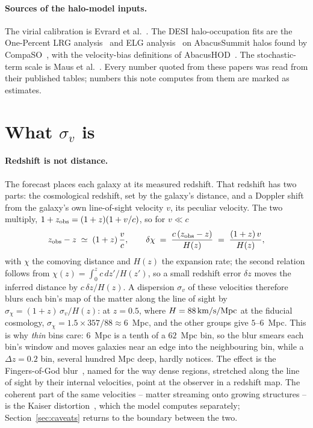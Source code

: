 \documentclass[11pt]{article}
\newcommand{\sv}{\sigma_v}
\newcommand{\kms}{\,{\rm km/s}}
\begin{document}
\paragraph{Sources of the halo-model inputs.}
The virial calibration is Evrard et al.~\cite{Evrard2008}.  The DESI
halo-occupation fits are the One-Percent LRG analysis~\cite{Yuan2023}
and ELG analysis~\cite{Rocher2023} on AbacusSummit halos found by
CompaSO~\cite{Hadzhiyska2022}, with the velocity-bias definitions of
AbacusHOD~\cite{Yuan2022}.  The stochastic-term scale is Maus et
al.~\cite{Maus2024}.  Every number quoted from these papers was read
from their published tables; numbers this note computes from them are
marked as estimates.

\section{What $\sv$ is}
\label{sec:what}

\paragraph{Redshift is not distance.}
The forecast places each galaxy at its measured redshift.  That
redshift has two parts: the cosmological redshift, set by the galaxy's
distance, and a Doppler shift from the galaxy's own line-of-sight
velocity $v$, its peculiar velocity.  The two multiply,
$1 + z_{\rm obs} = (1 + z)(1 + v/c)$, so for $v \ll c$
\begin{equation}
  z_{\rm obs} - z \;\simeq\; (1 + z)\,\frac{v}{c} ,
  \qquad
  \delta\chi \;=\; \frac{c\,(z_{\rm obs} - z)}{H(z)}
  \;=\; \frac{(1 + z)\,v}{H(z)} ,
  \label{eq:doppler}
\end{equation}
with $\chi$ the comoving distance and $H(z)$ the expansion rate; the
second relation follows from $\chi(z) = \int_0^z c\,dz'/H(z')$, so a
small redshift error $\delta z$ moves the inferred distance by
$c\,\delta z/H(z)$.  A
dispersion $\sv$ of these velocities therefore blurs each bin's map of
the matter along the line of sight by
$\sigma_\chi = (1 + z)\,\sv/H(z)$: at $z = 0.5$, where
$H = 88\kms/{\rm Mpc}$ at the fiducial cosmology,
$\sigma_\chi = 1.5 \times 357/88 \approx 6$~Mpc, and the other groups
give $5$--$6$~Mpc.  This is why \emph{thin} bins care: $6$~Mpc is a
tenth of a $62$~Mpc bin, so the blur smears each bin's window and
moves galaxies near an edge into the neighbouring bin, while a
$\Delta z = 0.2$ bin, several hundred Mpc deep, hardly notices.  The
effect is the Fingers-of-God blur~\cite{Jackson1972}, named for the
way dense regions, stretched along the line of sight by their internal
velocities, point at the observer in a redshift map.  The
coherent part of the same velocities -- matter streaming onto growing
structures -- is the Kaiser distortion~\cite{Kaiser1987}, which the
model computes separately; Section~\ref{sec:caveats} returns to the
boundary between the two.
\end{document}
